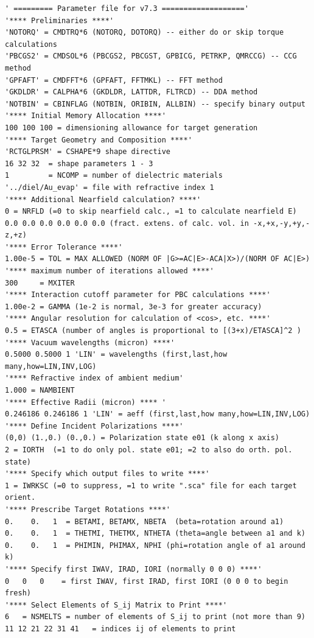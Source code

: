 \begin{appendix}
{\scriptsize
\begin{verbatim}
' ========= Parameter file for v7.3 ===================' 
'**** Preliminaries ****'
'NOTORQ' = CMDTRQ*6 (NOTORQ, DOTORQ) -- either do or skip torque calculations
'PBCGS2' = CMDSOL*6 (PBCGS2, PBCGST, GPBICG, PETRKP, QMRCCG) -- CCG method
'GPFAFT' = CMDFFT*6 (GPFAFT, FFTMKL) -- FFT method
'GKDLDR' = CALPHA*6 (GKDLDR, LATTDR, FLTRCD) -- DDA method
'NOTBIN' = CBINFLAG (NOTBIN, ORIBIN, ALLBIN) -- specify binary output
'**** Initial Memory Allocation ****'
100 100 100 = dimensioning allowance for target generation
'**** Target Geometry and Composition ****'
'RCTGLPRSM' = CSHAPE*9 shape directive
16 32 32  = shape parameters 1 - 3
1         = NCOMP = number of dielectric materials
'../diel/Au_evap' = file with refractive index 1
'**** Additional Nearfield calculation? ****'
0 = NRFLD (=0 to skip nearfield calc., =1 to calculate nearfield E)
0.0 0.0 0.0 0.0 0.0 0.0 (fract. extens. of calc. vol. in -x,+x,-y,+y,-z,+z)
'**** Error Tolerance ****'
1.00e-5 = TOL = MAX ALLOWED (NORM OF |G>=AC|E>-ACA|X>)/(NORM OF AC|E>)
'**** maximum number of iterations allowed ****'
300     = MXITER
'**** Interaction cutoff parameter for PBC calculations ****'
1.00e-2 = GAMMA (1e-2 is normal, 3e-3 for greater accuracy)
'**** Angular resolution for calculation of <cos>, etc. ****'
0.5	= ETASCA (number of angles is proportional to [(3+x)/ETASCA]^2 )
'**** Vacuum wavelengths (micron) ****'
0.5000 0.5000 1 'LIN' = wavelengths (first,last,how many,how=LIN,INV,LOG)
'**** Refractive index of ambient medium'
1.000 = NAMBIENT
'**** Effective Radii (micron) **** '
0.246186 0.246186 1 'LIN' = aeff (first,last,how many,how=LIN,INV,LOG)
'**** Define Incident Polarizations ****'
(0,0) (1.,0.) (0.,0.) = Polarization state e01 (k along x axis)
2 = IORTH  (=1 to do only pol. state e01; =2 to also do orth. pol. state)
'**** Specify which output files to write ****'
1 = IWRKSC (=0 to suppress, =1 to write ".sca" file for each target orient.
'**** Prescribe Target Rotations ****'
0.    0.   1  = BETAMI, BETAMX, NBETA  (beta=rotation around a1)
0.    0.   1  = THETMI, THETMX, NTHETA (theta=angle between a1 and k)
0.    0.   1  = PHIMIN, PHIMAX, NPHI (phi=rotation angle of a1 around k)
'**** Specify first IWAV, IRAD, IORI (normally 0 0 0) ****'
0   0   0    = first IWAV, first IRAD, first IORI (0 0 0 to begin fresh)
'**** Select Elements of S_ij Matrix to Print ****'
6	= NSMELTS = number of elements of S_ij to print (not more than 9)
11 12 21 22 31 41	= indices ij of elements to print

\end{verbatim}}
\end{appendix}
